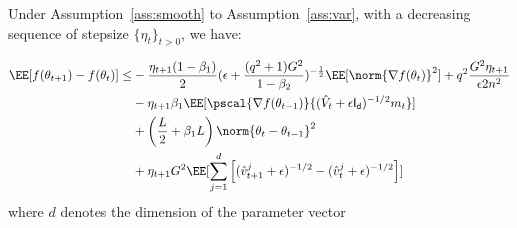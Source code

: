 \documentclass[11pt]{article}
\begin{document}
\begin{Lemma*}
Under Assumption~\ref{ass:smooth} to Assumption~\ref{ass:var}, with a decreasing sequence of stepsize $\{\eta_t\}_{t>0}$, we have:

\begin{equation}
\begin{split}
\EE[f(\theta_{t+1}) - f(\theta_{t}) ] \leq &   - \frac{\eta_{t+1}(1-\beta_1)}{2}  (\epsilon + \frac{(q^2+1)G^2}{1 - \beta_2})^{-\frac{1}{2}} \EE[\norm{\nabla f(\theta_t)}^2] +q^2 \frac{G^2 \eta_{t+1}}{\epsilon 2n^2} \\
&- \eta_{t+1} \beta_1\EE[\pscal{\nabla f(\theta_{t-1})}{(\hat{V}_{t} + \epsilon \mathsf{I_d})^{-1/2} m_{t}}]\\
& +  \left(\frac{L}{2} + \beta_1 L \right) \norm{\theta_t - \theta_{t-1}}^2\\
&+   \eta_{t+1} G^2 \EE[\sum_{j=1}^d \left[(\hat{v}^j_{t+1} + \epsilon )^{-1/2} - (\hat{v}^j_{t} + \epsilon )^{-1/2}  \right] ]
\end{split}
\end{equation}
where $d$ denotes the dimension of the parameter vector
\end{Lemma*}
\end{document}
